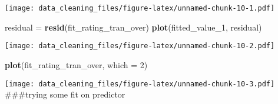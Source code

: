 \documentclass[
]{article}
\newenvironment{Shaded}{\begin{snugshade}}{\end{snugshade}}
\newcommand{\AttributeTok}[1]{\textcolor[rgb]{0.13,0.29,0.53}{#1}}
\newcommand{\DecValTok}[1]{\textcolor[rgb]{0.00,0.00,0.81}{#1}}
\newcommand{\FunctionTok}[1]{\textcolor[rgb]{0.13,0.29,0.53}{\textbf{#1}}}
\newcommand{\NormalTok}[1]{#1}
\newcommand{\OtherTok}[1]{\textcolor[rgb]{0.56,0.35,0.01}{#1}}
\newcommand{\SpecialCharTok}[1]{\textcolor[rgb]{0.81,0.36,0.00}{\textbf{#1}}}
\newcommand{\StringTok}[1]{\textcolor[rgb]{0.31,0.60,0.02}{#1}}
\begin{document}
\begin{Shaded}
\end{Shaded}

\texttt{[image: data\_cleaning\_files/figure-latex/unnamed-chunk-10-1.pdf]}

\begin{Shaded}
\begin{Highlighting}[]
\NormalTok{residual }\OtherTok{=} \FunctionTok{resid}\NormalTok{(fit\_rating\_tran\_over)}
\FunctionTok{plot}\NormalTok{(fitted\_value\_1, residual)}
\end{Highlighting}
\end{Shaded}

\texttt{[image: data\_cleaning\_files/figure-latex/unnamed-chunk-10-2.pdf]}

\begin{Shaded}
\begin{Highlighting}[]
\FunctionTok{plot}\NormalTok{(fit\_rating\_tran\_over, }\AttributeTok{which =} \DecValTok{2}\NormalTok{)}
\end{Highlighting}
\end{Shaded}

\texttt{[image: data\_cleaning\_files/figure-latex/unnamed-chunk-10-3.pdf]}
\#\#\#trying some fit on predictor
\end{document}
